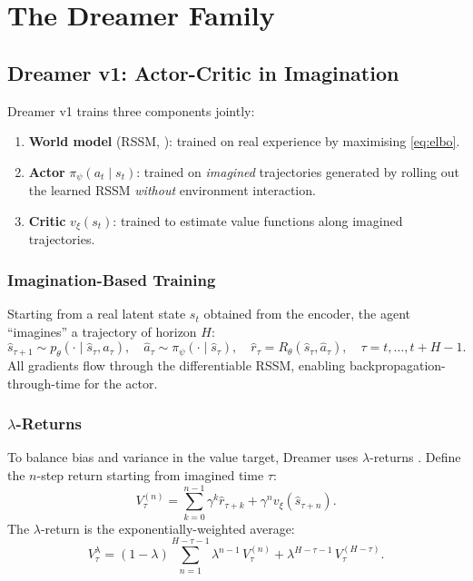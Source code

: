 \documentclass[11pt,a4paper]{article}
\theoremstyle{definition}
\begin{document}
\section{The Dreamer Family}\label{sec:dreamer}

\subsection{Dreamer v1: Actor-Critic in Imagination}

Dreamer v1 \cite{hafner2020dream} trains three components jointly:

\begin{enumerate}
  \item \textbf{World model} (RSSM, ): trained on real
    experience by maximising \eqref{eq:elbo}.
  \item \textbf{Actor} $\pi_\psi(a_t \mid s_t)$: trained on
    \emph{imagined} trajectories generated by rolling out the learned
    RSSM \emph{without} environment interaction.
  \item \textbf{Critic} $v_\xi(s_t)$: trained to estimate value
    functions along imagined trajectories.
\end{enumerate}

\subsubsection{Imagination-Based Training}

Starting from a real latent state $s_t$ obtained from the encoder, the
agent ``imagines'' a trajectory of horizon $H$:
\begin{equation}\label{eq:imagination}
  \hat{s}_{\tau+1} \sim p_\theta(\cdot \mid \hat{s}_\tau, \hat{a}_\tau),
  \quad
  \hat{a}_\tau \sim \pi_\psi(\cdot \mid \hat{s}_\tau),
  \quad
  \hat{r}_\tau = R_\theta(\hat{s}_\tau, \hat{a}_\tau),
  \quad \tau = t, \ldots, t+H-1.
\end{equation}
All gradients flow through the differentiable RSSM, enabling
backpropagation-through-time for the actor.

\subsubsection{$\lambda$-Returns}\label{sec:lambda_returns}

To balance bias and variance in the value target, Dreamer uses
$\lambda$-returns \cite{sutton2018reinforcement}. Define the $n$-step
return starting from imagined time $\tau$:
\begin{equation}
  V_\tau^{(n)}
  = \sum_{k=0}^{n-1} \gamma^k \hat{r}_{\tau+k}
    + \gamma^n v_\xi(\hat{s}_{\tau+n}).
\end{equation}
The $\lambda$-return is the exponentially-weighted average:
\begin{equation}\label{eq:lambda_return}
  V_\tau^\lambda
  = (1 - \lambda)\sum_{n=1}^{H-\tau-1} \lambda^{n-1}\, V_\tau^{(n)}
    + \lambda^{H-\tau-1}\, V_\tau^{(H-\tau)}.
\end{equation}
\end{document}
